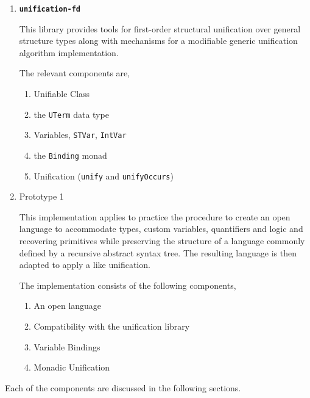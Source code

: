 \documentclass[thesis-solanki.tex]{subfiles}
\providecommand\codeLibrary[1]{\texttt{\bfseries #1}}
\begin{document}
\begin{enumerate}
\item \codeLibrary{unification-fd} \cite{unification-fd-lib}

This library provides tools for first-order structural unification over general structure types along with mechanisms for a modifiable 
generic unification algorithm implementation. 

The relevant components are,
\begin{enumerate}
\item Unifiable Class

\item the \Verb!UTerm! data type

\item Variables,
  \Verb!STVar!, \Verb!IntVar!

\item the \Verb!Binding! monad

\item Unification (\Verb!unify! and \Verb!unifyOccurs!)
\end{enumerate}

\item Prototype 1

  This implementation applies to practice the procedure to create an open language to accommodate types,
  custom variables, quantifiers and logic and recovering primitives while preserving the structure of a
  language commonly defined by a recursive abstract syntax tree.
  The resulting language is then adapted to apply a  like unification.

The implementation consists of the following components,
\begin{enumerate}
\item An open language

\item Compatibility with the unification library \cite{unification-fd-lib}

\item Variable Bindings

\item Monadic Unification

\end{enumerate}
\end{enumerate}  

Each of the components are discussed in the following sections.
\end{document}
